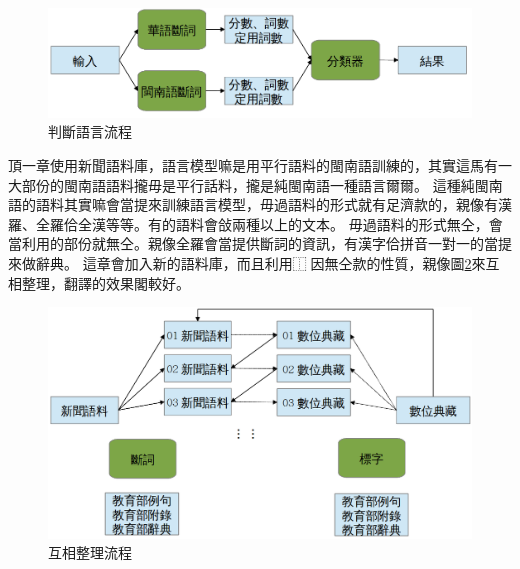 \begin{figure}
\centerline{\includegraphics[keepaspectratio]{圖/判斷語言架構}}
\caption{判斷語言流程}
\label{圖：判斷語言架構}
\end{figure}


頂一章使用新聞語料庫，語言模型嘛是用平行語料的閩南語訓練的，其實這馬有一大部份的閩南語語料攏毋是平行話料，攏是純閩南語一種語言爾爾。
這種純閩南語的語料其實嘛會當提來訓練語言模型，毋過語料的形式就有足濟款的，親像有漢羅、全羅佮全漢等等。有的語料會敆兩種以上的文本。
毋過語料的形式無仝，會當利用的部份就無仝。親像全羅會當提供斷詞的資訊，有漢字佮拼音一對一的當提來做辭典。
這章會加入新的語料庫，而且利用⿰因無仝款的性質，親像圖\ref{圖：互相整理架構}來互相整理，翻譯的效果閣較好。

\begin{figure}
\centerline{\includegraphics[keepaspectratio,width=40em]{圖/互相整理架構}}
\caption{互相整理流程}
\label{圖：互相整理架構}
\end{figure}




